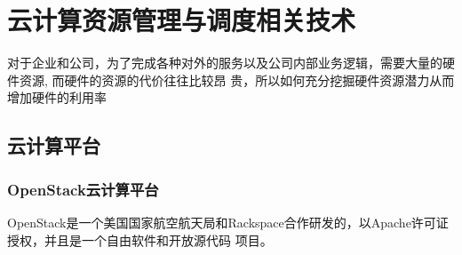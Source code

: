 
\chapter{云计算资源管理与调度相关技术}
\label{chap:outline}

对于企业和公司，为了完成各种对外的服务以及公司内部业务逻辑，需要大量的硬件资源, 而硬件的资源的代价往往比较昂
贵，所以如何充分挖掘硬件资源潜力从而增加硬件的利用率

\section{云计算平台}
\subsection{OpenStack云计算平台}

OpenStack是一个美国国家航空航天局和Rackspace合作研发的，以Apache许可证授权，并且是一个自由软件和开放源代码
项目。


